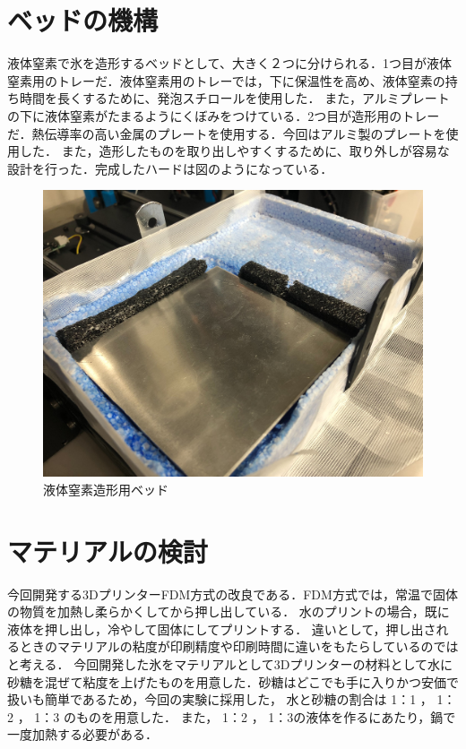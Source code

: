 \section{ベッドの機構}
\label{sec:paragraph}
液体窒素で氷を造形するベッドとして、大きく２つに分けられる．1つ目が液体窒素用のトレーだ．液体窒素用のトレーでは，下に保温性を高め、液体窒素の持ち時間を長くするために、発泡スチロールを使用した．
また，アルミプレートの下に液体窒素がたまるようにくぼみをつけている．2つ目が造形用のトレーだ．熱伝導率の高い金属のプレートを使用する．今回はアルミ製のプレートを使用した．
また，造形したものを取り出しやすくするために、取り外しが容易な設計を行った．完成したハードは図のようになっている．

\begin{figure}[H]
  \centering
  \includegraphics[width=7truecm]{./fig/101285898.jpg}
  \caption{液体窒素造形用ベッド}
  \label{fig:stage}
\end{figure}

\section{マテリアルの検討}
\label{sec:paragraph}
今回開発する3DプリンターFDM方式の改良である．FDM方式では，常温で固体の物質を加熱し柔らかくしてから押し出している．
水のプリントの場合，既に液体を押し出し，冷やして固体にしてプリントする．
違いとして，押し出されるときのマテリアルの粘度が印刷精度や印刷時間に違いをもたらしているのではと考える．
今回開発した氷をマテリアルとして3Dプリンターの材料として水に砂糖を混ぜて粘度を上げたものを用意した．砂糖はどこでも手に入りかつ安価で扱いも簡単であるため，今回の実験に採用した，
水と砂糖の割合は 1：1 ， 1：2 ， 1：3 のものを用意した．
また， 1：2 ， 1：3の液体を作るにあたり，鍋で一度加熱する必要がある．



